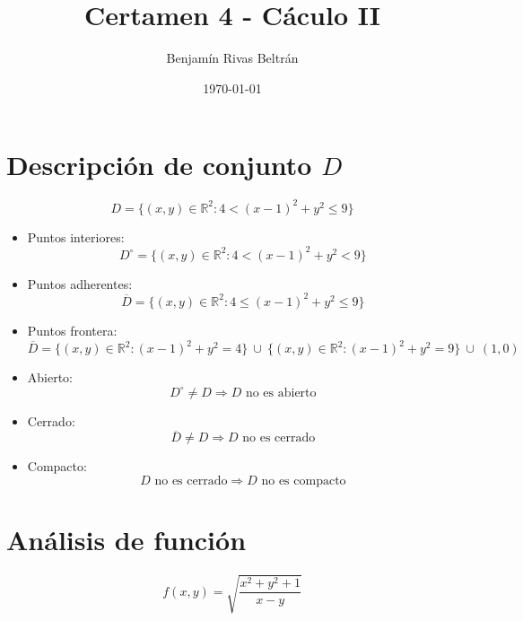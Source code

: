 \documentclass{article}
\title{Certamen 4 - Cáculo II}
\author{Benjamín Rivas Beltrán}
\date{\today}
\newcommand{\R}{\mathbb{R}}
\begin{document}
\maketitle

\section{Descripción de conjunto $D$}
\[
  D = \{(x, y) \in \R^2 : 4 < (x - 1)^2 + y^2 \leq 9 \}
\]

\begin{itemize}
  \item Puntos interiores:
  \[
    D^\circ = \{(x, y) \in \R^2 : 4 < (x - 1)^2 + y^2 < 9 \}
  \]
  
  \item Puntos adherentes:
  \[
    \overline{D} = \{(x, y) \in \R^2 : 4 \leq (x - 1)^2 + y^2 \leq 9 \}
  \]
  
  \item Puntos frontera:
  \[
    \overline{D} = \{(x, y) \in \R^2 : (x - 1)^2 + y^2 = 4 \} \ \cup \ \{(x, y) \in \R^2 : (x - 1)^2 + y^2 = 9 \} \ \cup \ {(1, 0)}
  \]

  \item Abierto:
  \[
    D^\circ \neq D \Rightarrow D \text{ no es abierto}
  \]

  \item Cerrado:
  \[
    \overline{D} \neq D \Rightarrow D \text{ no es cerrado}
  \]

  \item Compacto:
  \[
    D \text{ no es cerrado} \Rightarrow D \text{ no es compacto}
  \]
\end{itemize}

\section{Análisis de función}

\[
f(x, y) = \sqrt{\frac{x^2 + y^2 + 1}{x - y}}
\]
\end{document}
